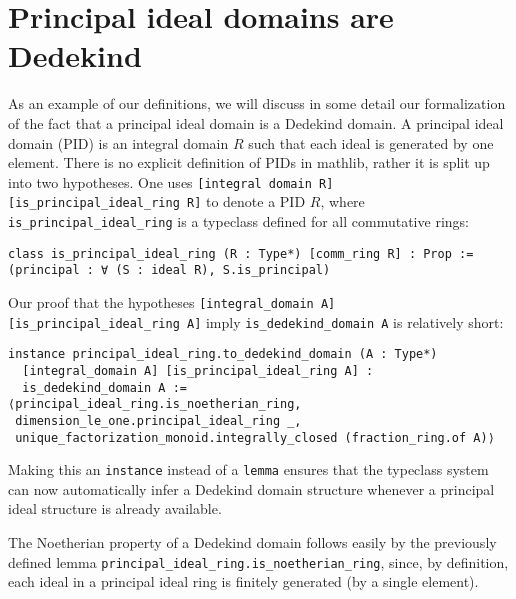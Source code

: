 \documentclass[a4paper,USenglish,cleveref, autoref, thm-restate]{lipics-v2021}
\newcommand{\lean}[1]{\texttt{#1}\xspace} %
\newcommand{\mathlib}{\textsf{mathlib}\xspace}
\begin{document}
\section{Principal ideal domains are Dedekind}

As an example of our definitions, we will discuss in some detail our formalization of the fact that a principal ideal domain is a Dedekind domain.
A principal ideal domain (PID) is an integral domain $R$ such that each ideal is generated by one element.
There is no explicit definition of PIDs in \mathlib, rather it is split up into two hypotheses.
One uses \lean{[integral domain R] [is\_principal\_ideal\_ring R]} to denote a PID $R$,
where \lean{is\_principal\_ideal\_ring} is a typeclass defined for all commutative rings:
\begin{lstlisting}
class is_principal_ideal_ring (R : Type*) [comm_ring R] : Prop :=
(principal : ∀ (S : ideal R), S.is_principal)
\end{lstlisting}

Our proof that the hypotheses \lean{[integral\_domain A] [is\_principal\_ideal\_ring A]} imply \lean{is\_dedekind\_domain A} is relatively short:
\begin{lstlisting}
instance principal_ideal_ring.to_dedekind_domain (A : Type*)
  [integral_domain A] [is_principal_ideal_ring A] :
  is_dedekind_domain A :=
⟨principal_ideal_ring.is_noetherian_ring,
 dimension_le_one.principal_ideal_ring _,
 unique_factorization_monoid.integrally_closed (fraction_ring.of A)⟩
\end{lstlisting}

Making this an \lean{instance} instead of a \lean{lemma} ensures that the typeclass system can now automatically infer a Dedekind domain structure whenever a principal ideal structure is already available.

The Noetherian property of a Dedekind domain follows easily by the previously defined lemma \lean{principal\_ideal\_ring.is\_noetherian\_ring}, since, by definition, each ideal in a principal ideal ring is finitely generated (by a single element).
\end{document}
